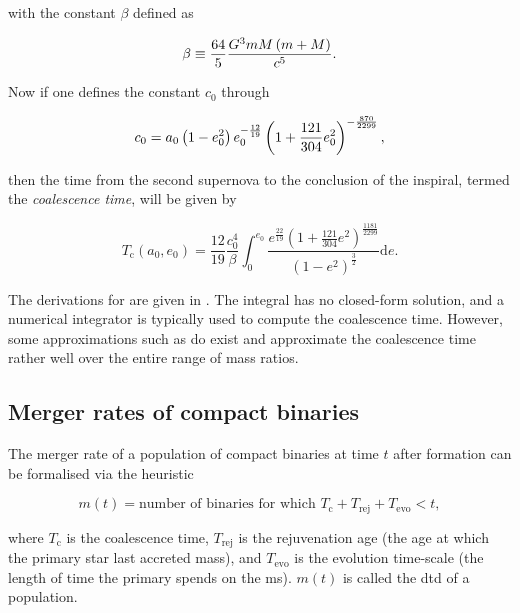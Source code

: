 with the constant $\beta$ defined as

\begin{equation}
    \beta \equiv \frac{64}{5}\frac{G^3mM\left(m+M\right)}{c^5}.
\end{equation}

Now if one defines the constant $c_0$ through

\begin{equation}
    c_0 = a_0\left(1-e_0^2\right)e_0^{-\frac{12}{19}}\left(1+\frac{121}{304}e_0^2\right)^{-\frac{870}{2299}},
\end{equation}

then the time from the second supernova to the conclusion of the inspiral, termed the \textit{coalescence time}, will be given by

\begin{equation}
    T_\text{c}(a_0, e_0) = \frac{12}{19}\frac{c_0^4}{\beta}\int_0^{e_0} \frac{e^\frac{22}{19}\left(1+\frac{121}{304}e^2\right)^\frac{1181}{2299}}{\left(1-e^2\right)^\frac32}{ \mathrm{d}e}.\label{eq:coalescence_time}
\end{equation}

The derivations for  are given in . The integral has no closed-form solution, and a numerical integrator is typically used to compute the coalescence time. However, some approximations such as \citet{Mandel:2021a} do exist and approximate the coalescence time rather well over the entire range of mass ratios.

\subsection{Merger rates of compact binaries}

The merger rate of a population of compact binaries at time $t$ after formation can be formalised via the heuristic

\begin{equation}
    m(t) = \text{number of binaries for which $T_\text{c} + T_\text{rej} + T_\text{evo} < t$},\label{eq:definition_of_merger_rate}
\end{equation}

where $T_\text{c}$ is the coalescence time, $T_\text{rej}$ is the rejuvenation age (the age at which the primary star last accreted mass), and $T_\text{evo}$ is the evolution time-scale (the length of time the primary spends on the \gls{ms}). $m(t)$ is called the \gls{dtd} of a population.

